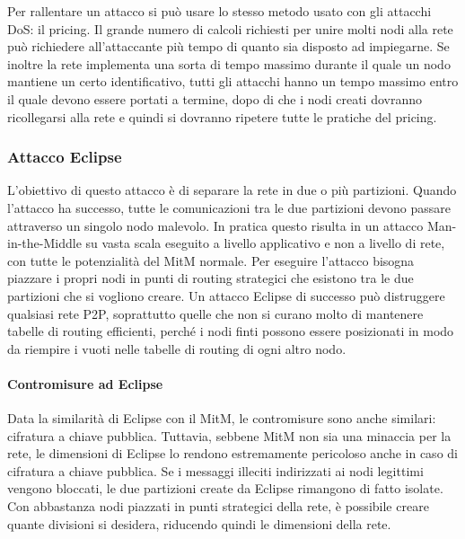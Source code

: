 Per rallentare un attacco si può usare lo stesso metodo usato con gli attacchi DoS: il pricing. %
Il grande numero di calcoli richiesti per unire molti nodi alla rete può richiedere all'attaccante più tempo di quanto sia disposto ad impiegarne. Se inoltre la rete implementa una sorta di tempo massimo durante il quale un nodo mantiene un certo identificativo, tutti gli attacchi hanno un tempo massimo entro il quale devono essere portati a termine, dopo di che i nodi creati dovranno ricollegarsi alla rete e quindi si dovranno ripetere tutte le pratiche del pricing.

\subsubsection{Attacco Eclipse}\label{attacco-eclipse}

L'obiettivo di questo attacco è di separare la rete in due o più partizioni. Quando l'attacco ha successo, tutte le comunicazioni tra le due partizioni devono passare attraverso un singolo nodo malevolo. In pratica questo risulta in un attacco Man-in-the-Middle su vasta scala eseguito a livello applicativo e non a livello di rete, con tutte le potenzialità del MitM normale. Per eseguire l'attacco bisogna piazzare i propri nodi in punti di routing strategici che esistono tra le due partizioni che si vogliono creare. Un attacco Eclipse di successo può distruggere qualsiasi rete P2P, soprattutto quelle che non si curano molto di mantenere tabelle di routing efficienti, perché i nodi finti possono essere posizionati in modo da riempire i vuoti nelle tabelle di routing di ogni altro nodo.

\paragraph{Contromisure ad Eclipse}\label{contromisure-ad-eclipse}

Data la similarità di Eclipse con il MitM, le contromisure sono anche similari: cifratura a chiave pubblica. Tuttavia, sebbene MitM non sia una minaccia per la rete, le dimensioni di Eclipse lo rendono estremamente pericoloso anche in caso di cifratura a chiave pubblica. Se i messaggi illeciti indirizzati ai nodi legittimi vengono bloccati, le due partizioni create da Eclipse rimangono di fatto isolate. Con abbastanza nodi piazzati in punti strategici della rete, è possibile creare quante divisioni si desidera, riducendo quindi le dimensioni della rete.

